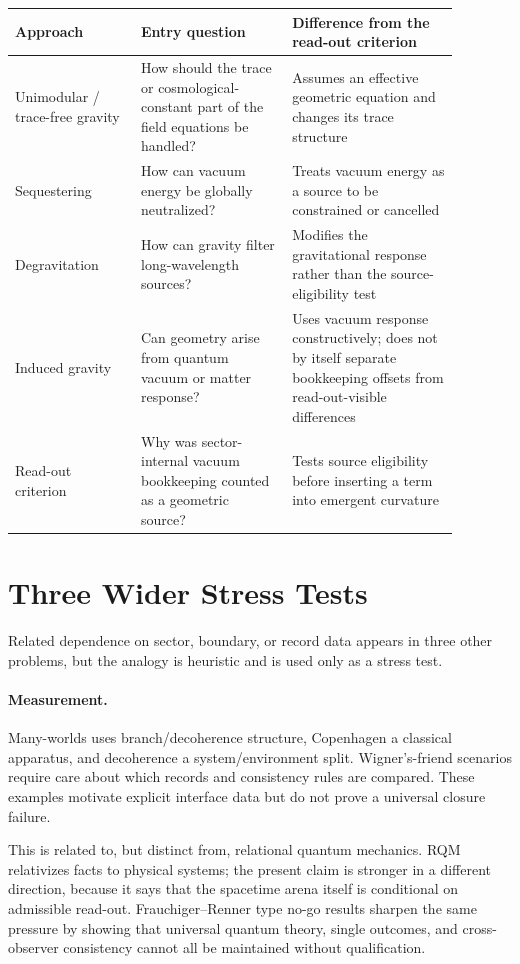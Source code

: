 \documentclass[12pt,a4paper]{article}
\theoremstyle{definition}
\theoremstyle{remark}
\begin{document}
\begin{center}
\begin{tabular}{P{0.25\linewidth}P{0.30\linewidth}P{0.33\linewidth}}
\toprule
\textbf{Approach} & \textbf{Entry question} & \textbf{Difference from the read-out criterion} \\
\midrule
Unimodular / trace-free gravity & How should the trace or cosmological-constant part of the field equations be handled? & Assumes an effective geometric equation and changes its trace structure \\
Sequestering & How can vacuum energy be globally neutralized? & Treats vacuum energy as a source to be constrained or cancelled \\
Degravitation & How can gravity filter long-wavelength sources? & Modifies the gravitational response rather than the source-eligibility test \\
Induced gravity & Can geometry arise from quantum vacuum or matter response? & Uses vacuum response constructively; does not by itself separate bookkeeping offsets from read-out-visible differences \\
Read-out criterion & Why was sector-internal vacuum bookkeeping counted as a geometric source? & Tests source eligibility before inserting a term into emergent curvature \\
\bottomrule
\end{tabular}
\end{center}

\section{Three Wider Stress Tests}
\label{sec:stress}

Related dependence on sector, boundary, or record data appears in three other problems, but the analogy is heuristic and is used only as a stress test.

\paragraph{Measurement.}
Many-worlds uses branch/decoherence structure, Copenhagen a classical apparatus, and decoherence a system/environment split. Wigner's-friend scenarios require care about which records and consistency rules are compared.  These examples motivate explicit interface data but do not prove a universal closure failure.

This is related to, but distinct from, relational quantum mechanics. RQM relativizes facts to physical systems; the present claim is stronger in a different direction, because it says that the spacetime arena itself is conditional on admissible read-out. Frauchiger--Renner type no-go results sharpen the same pressure by showing that universal quantum theory, single outcomes, and cross-observer consistency cannot all be maintained without qualification.
\end{document}
